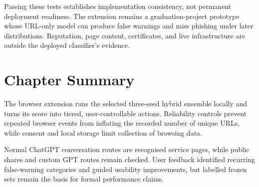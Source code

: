 Passing these tests establishes implementation consistency, not permanent
deployment readiness. The extension remains a graduation-project prototype
whose URL-only model can produce false warnings and miss phishing under later
distributions. Reputation, page content, certificates, and live infrastructure
are outside the deployed classifier's evidence.

\section{Chapter Summary}

The browser extension runs the selected three-seed hybrid ensemble locally and
turns its score into tiered, user-controllable actions. Reliability controls
prevent repeated browser events from inflating the recorded number of unique
URLs, while consent and local storage limit collection of browsing data.

Normal ChatGPT conversation routes are recognised service pages, while public
shares and custom GPT routes remain checked. User feedback identified
recurring false-warning categories and guided usability improvements, but
labelled frozen sets remain the basis for formal performance claims.
